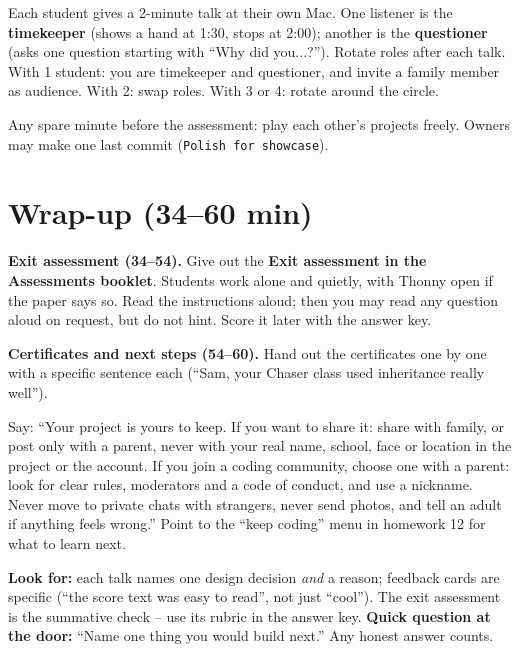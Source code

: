 \begin{pairroles}
Each student gives a 2-minute talk at their own Mac. One listener is the \textbf{timekeeper} (shows a hand at 1:30, stops at 2:00); another is the \textbf{questioner} (asks one question starting with \enquote{Why did you...?}). Rotate roles after each talk. With 1 student: you are timekeeper and questioner, and invite a family member as audience. With 2: swap roles. With 3 or 4: rotate around the circle.
\end{pairroles}

\begin{freebuild}
Any spare minute before the assessment: play each other's projects freely. Owners may make one last commit (\texttt{Polish for showcase}).
\end{freebuild}

\section{Wrap-up (34--60 min)}
\textbf{Exit assessment (34--54).} Give out the \textbf{Exit assessment in the Assessments booklet}. Students work alone and quietly, with Thonny open if the paper says so. Read the instructions aloud; then you may read any question aloud on request, but do not hint. Score it later with the answer key.

\textbf{Certificates and next steps (54--60).} Hand out the certificates one by one with a specific sentence each (\enquote{Sam, your Chaser class used inheritance really well}).

\begin{safety}
Say: \enquote{Your project is yours to keep. If you want to share it: share with family, or post only with a parent, never with your real name, school, face or location in the project or the account. If you join a coding community, choose one with a parent: look for clear rules, moderators and a code of conduct, and use a nickname. Never move to private chats with strangers, never send photos, and tell an adult if anything feels wrong.} Point to the \enquote{keep coding} menu in homework 12 for what to learn next.
\end{safety}

\begin{formativecheck}
\textbf{Look for:} each talk names one design decision \emph{and} a reason; feedback cards are specific (\enquote{the score text was easy to read}, not just \enquote{cool}). The exit assessment is the summative check -- use its rubric in the answer key.
\textbf{Quick question at the door:} \enquote{Name one thing you would build next.} Any honest answer counts.
\end{formativecheck}

